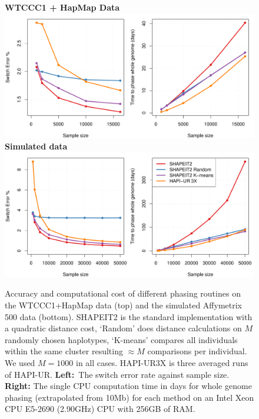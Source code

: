 \begin{figure}
\centering
\textbf{WTCCC1 + HapMap Data}\\
   \includegraphics[width=\textwidth]{chap5figs/wtccc}\\%
\vspace{20pt}
\textbf{Simulated data}\\
   \includegraphics[width=\textwidth]{chap5figs/simulated}%
\caption[Accuracy and computation comparison for increasing sample sizes]{Accuracy and computational cost of different phasing routines on the WTCCC1+HapMap data (top) and the simulated Affymetrix 500 data (bottom). SHAPEIT2 is the standard implementation with a quadratic distance cost, `Random' does distance calculations on $M$ randomly chosen haplotypes, `K-means' compares all individuals within the same cluster resulting $\approx M$ comparisons per individual. We used $M=1000$ in all cases.  HAPI-UR3X  is three averaged runs of HAPI-UR. \textbf{Left:}~The switch error rate against sample size.  \textbf{Right:} The single CPU computation time in days for whole genome phasing (extrapolated from 10Mb) for each method on an Intel Xeon CPU E5-2690 (2.90GHz) CPU with 256GB of RAM. \label{chap5:switch}}
\end{figure}

